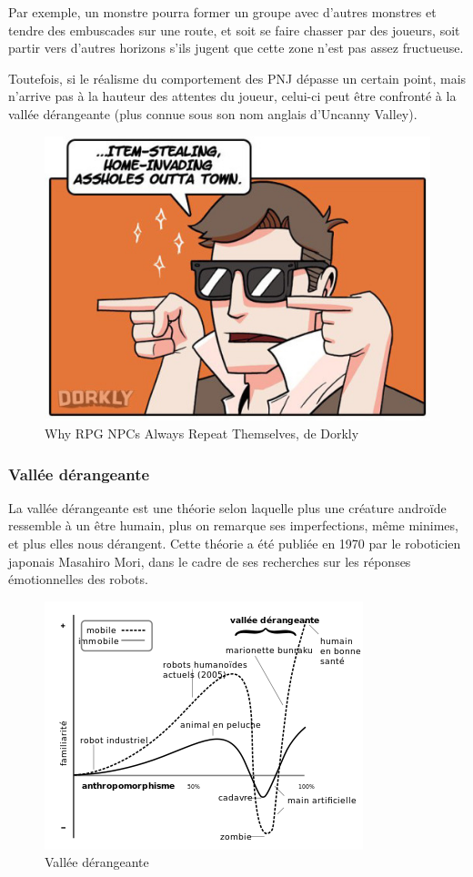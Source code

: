 \documentclass[a4paper, 12pt]{article} %
\begin{document}
Par exemple, un monstre pourra former un groupe avec d’autres monstres et tendre des embuscades sur une route, et soit se faire chasser par des joueurs, soit partir vers d’autres horizons s’ils jugent que cette zone n’est pas assez fructueuse.

Toutefois, si le réalisme du comportement des PNJ dépasse un certain point, mais n’arrive pas à la hauteur des attentes du joueur, celui-ci peut être confronté à la vallée dérangeante (plus connue sous son nom anglais d’Uncanny Valley).

\begin{figure}[!h]%
	\begin{center} 
		\includegraphics[width=0.60\columnwidth]{images/repeat4.png}%
		\caption{Why RPG NPCs Always Repeat Themselves, de Dorkly}%
	\end{center}
\end{figure}

\newpage
\subsubsection{Vallée dérangeante}

La vallée dérangeante est une théorie selon laquelle plus une créature androïde ressemble à un être humain, plus on remarque ses imperfections, même minimes, et plus elles nous dérangent. Cette théorie a été publiée en 1970 par le roboticien japonais Masahiro Mori, dans le cadre de ses recherches sur les réponses émotionnelles des robots.

\begin{figure}[!h]%
	\begin{center} 
		\includegraphics[width=0.60\columnwidth]{images/uncannyValley.png}%
		\caption{Vallée dérangeante}%
	\end{center}
\end{figure}
\end{document}
